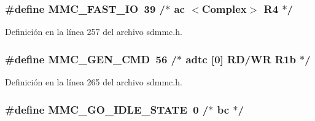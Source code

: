 \subsubsection[{\texorpdfstring{M\+M\+C\+\_\+\+F\+A\+S\+T\+\_\+\+IO}{MMC_FAST_IO}}]{\setlength{\rightskip}{0pt plus 5cm}\#define M\+M\+C\+\_\+\+F\+A\+S\+T\+\_\+\+IO~39		/$\ast$ ac   $<$Complex$>$          R4  $\ast$/}\hypertarget{group___c_h_i_p___s_d_m_m_c___definitions_ga220084bda4db087882522cfddd5048ee}{}\label{group___c_h_i_p___s_d_m_m_c___definitions_ga220084bda4db087882522cfddd5048ee}


Definición en la línea 257 del archivo sdmmc.\+h.

\subsubsection[{\texorpdfstring{M\+M\+C\+\_\+\+G\+E\+N\+\_\+\+C\+MD}{MMC_GEN_CMD}}]{\setlength{\rightskip}{0pt plus 5cm}\#define M\+M\+C\+\_\+\+G\+E\+N\+\_\+\+C\+MD~56		/$\ast$ adtc \mbox{[}0\mbox{]}     RD/WR      R1b $\ast$/}\hypertarget{group___c_h_i_p___s_d_m_m_c___definitions_ga887a1939f19dc9de4be4a465be256ffe}{}\label{group___c_h_i_p___s_d_m_m_c___definitions_ga887a1939f19dc9de4be4a465be256ffe}


Definición en la línea 265 del archivo sdmmc.\+h.

\subsubsection[{\texorpdfstring{M\+M\+C\+\_\+\+G\+O\+\_\+\+I\+D\+L\+E\+\_\+\+S\+T\+A\+TE}{MMC_GO_IDLE_STATE}}]{\setlength{\rightskip}{0pt plus 5cm}\#define M\+M\+C\+\_\+\+G\+O\+\_\+\+I\+D\+L\+E\+\_\+\+S\+T\+A\+TE~0		/$\ast$ bc                          $\ast$/}\hypertarget{group___c_h_i_p___s_d_m_m_c___definitions_ga8cf3224a23122ebda44e49c946adfd04}{}\label{group___c_h_i_p___s_d_m_m_c___definitions_ga8cf3224a23122ebda44e49c946adfd04}


